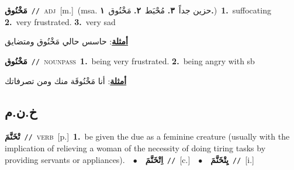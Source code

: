 \documentclass[10pt,a4paper,twoside]{article} %
\begin{document}
\begin{multicols}{2}
{\setlength\topsep{0pt}\textbf{\foreignlanguage{arabic}{مَخْنُوق}}\ {\color{gray}\texttt{//}\color{black}}\ \textsc{adj}\ [m.]\ \color{gray}(msa. \foreignlanguage{arabic}{حزين جداً}~\foreignlanguage{arabic}{\textbf{٣.}}  \foreignlanguage{arabic}{مُحْبَط}~\foreignlanguage{arabic}{\textbf{٢.}}  \foreignlanguage{arabic}{مَخْنُوق}~\foreignlanguage{arabic}{\textbf{١.}})\color{black}\ \textbf{1.}~suffocating  \textbf{2.}~very frustrated.  \textbf{3.}~very sad\  \begin{flushright}\color{gray}\foreignlanguage{arabic}{\textbf{\underline{\foreignlanguage{arabic}{أمثلة}}}: حاسس حالي مَخْنُوق ومتضايق}\end{flushright}\color{black}} \vspace{2mm}

{\setlength\topsep{0pt}\textbf{\foreignlanguage{arabic}{مَخْنُوق}}\ {\color{gray}\texttt{//}\color{black}}\ \textsc{noun\textunderscore pass}\ \textbf{1.}~being very frustrated.  \textbf{2.}~being angry with sb\  \begin{flushright}\color{gray}\foreignlanguage{arabic}{\textbf{\underline{\foreignlanguage{arabic}{أمثلة}}}: أنا مَخْنُوقَة منك ومن تصرفاتك}\end{flushright}\color{black}} \vspace{2mm}

\vspace{-3mm}
\subsection*{\color{blue}\foreignlanguage{arabic}{خ.ن.م}\color{blue}{}} 

{\setlength\topsep{0pt}\textbf{\foreignlanguage{arabic}{تْخَنَّمَ}}\ {\color{gray}\texttt{//}\color{black}}\ \textsc{verb}\ [p.]\ \textbf{1.}~be given the due as a feminine creature (usually with the implication of relieving a woman of the necessity of doing tiring tasks by providing servants or appliances).\ \ $\bullet$\ \ \setlength\topsep{0pt}\textbf{\foreignlanguage{arabic}{اِتْخَنَّمَ}}\ {\color{gray}\texttt{//}\color{black}}\ [c.]\ \ $\bullet$\ \ \setlength\topsep{0pt}\textbf{\foreignlanguage{arabic}{يِتْخَنَّمَ}}\ {\color{gray}\texttt{//}\color{black}}\ [i.]\ } \vspace{2mm}


\end{multicols}
\end{document}
